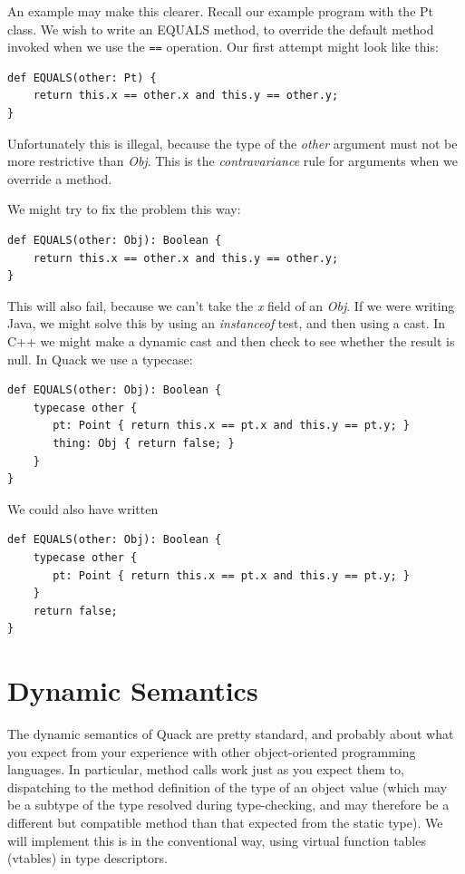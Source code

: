 \documentclass[11pt]{article}
\begin{document}
An example may make this clearer.  Recall our example program with the
Pt class.  We wish to write an EQUALS method, to override the default
method invoked when we use the \verb|==| operation.  Our first attempt 
might look like this: 

\begin{verbatim}
def EQUALS(other: Pt) {
    return this.x == other.x and this.y == other.y;
}
\end{verbatim}

Unfortunately this is illegal, because the type of the \emph{other}
argument must not be more restrictive than \emph{Obj}.  This is the 
\emph{contravariance} rule for arguments when we override a method. 

We might try to fix the problem this way: 

\begin{verbatim}
def EQUALS(other: Obj): Boolean {
    return this.x == other.x and this.y == other.y;
}
\end{verbatim}

This will also fail, because we can't take the \emph{x} field of an
\emph{Obj}.   If we were writing Java, we might solve this by using an
\emph{instanceof} test, and then using a cast.  In C++ we might make a
dynamic cast and then check to see whether the result is null.  In
Quack we use a typecase: 

\begin{verbatim}
def EQUALS(other: Obj): Boolean {
    typecase other {
       pt: Point { return this.x == pt.x and this.y == pt.y; }
       thing: Obj { return false; }
    }
}
\end{verbatim}

We could also have written

\begin{verbatim}
def EQUALS(other: Obj): Boolean {
    typecase other {
       pt: Point { return this.x == pt.x and this.y == pt.y; }
    }
    return false; 
}
\end{verbatim}



\section{Dynamic Semantics}

The dynamic semantics of Quack are pretty standard, and probably about
what you expect from your experience with  other object-oriented
programming languages.  In particular, method calls work just as you
expect them to, dispatching to the method definition of the type of an
object value (which may be a subtype of the type resolved during
type-checking, and may therefore be a different but compatible method
than that expected from the static type).  We will implement this is
in the conventional way, using virtual function tables (vtables) in
type descriptors.  
\end{document}
